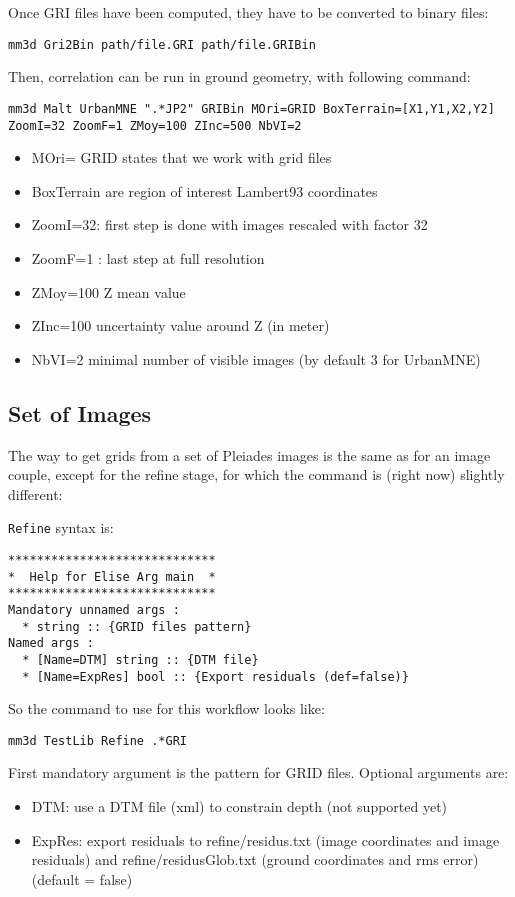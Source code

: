 Once GRI files have been computed, they have to be converted to binary files:
\begin{verbatim}
mm3d Gri2Bin path/file.GRI path/file.GRIBin
\end{verbatim}

Then, correlation can be run in ground geometry, with following command:

\begin{verbatim}
mm3d Malt UrbanMNE ".*JP2" GRIBin MOri=GRID BoxTerrain=[X1,Y1,X2,Y2]
ZoomI=32 ZoomF=1 ZMoy=100 ZInc=500 NbVI=2
\end{verbatim}

\begin{itemize}
 \item MOri= GRID states that we work with grid files
 \item   BoxTerrain are region of interest Lambert93 coordinates
 \item   ZoomI=32: first step is done with images rescaled with factor 32
 \item   ZoomF=1 : last step at full resolution
 \item   ZMoy=100  Z mean value
 \item   ZInc=100 uncertainty value around Z (in meter)
 \item   NbVI=2 minimal number of visible images  (by default 3 for UrbanMNE)
\end{itemize}

\subsection{Set of Images}

The way to get grids from a set of Pleiades images is the same as for an image couple, except for the refine stage, for which the command is (right now) slightly different:

{\tt Refine} syntax is:

\begin{verbatim}
*****************************
*  Help for Elise Arg main  *
*****************************
Mandatory unnamed args :
  * string :: {GRID files pattern}
Named args :
  * [Name=DTM] string :: {DTM file}
  * [Name=ExpRes] bool :: {Export residuals (def=false)}
\end{verbatim}

So the command to use for this workflow looks like:
\begin{verbatim}
mm3d TestLib Refine .*GRI
\end{verbatim}

First mandatory argument is the pattern for GRID files. Optional arguments are:
\begin{itemize}
\item DTM: use a DTM file (xml) to constrain depth (not supported yet)
\item ExpRes: export residuals to refine/residus.txt (image coordinates and image residuals) and refine/residusGlob.txt (ground coordinates and rms error) (default = false)
\end{itemize}


